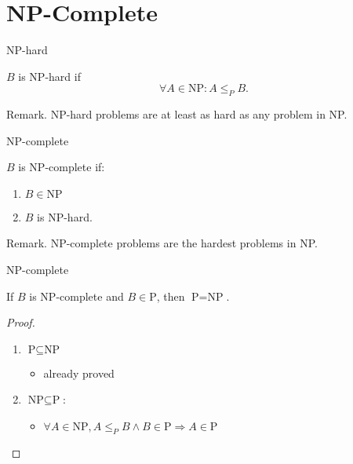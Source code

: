 \section{NP-Complete}

\begin{frame}{NP-hard}
  \begin{definition}[NP-hard]
    $B$ is NP-hard if
    \[
      \forall A \in \text{NP}: A \le_{P} B.
    \]
  \end{definition}

  \begin{alertblock}{Remark.}
    NP-hard problems are at least as hard as any problem in NP.
  \end{alertblock}
\end{frame}
\begin{frame}{NP-complete}
  \begin{definition}[NP-complete]
    $B$ is NP-complete if:
    \begin{enumerate}
      \item $B \in \text{NP}$
      \item $B$ is NP-hard.
    \end{enumerate}
  \end{definition}

  \begin{alertblock}{Remark.}
    NP-complete problems are the hardest problems in NP.
  \end{alertblock}
\end{frame}
\begin{frame}{NP-complete}
  \begin{theorem}
    If $B$ is NP-complete and $B \in \text{P}$, then $\text{P} = \text{NP}$.
  \end{theorem}

  \begin{proof}
    \begin{enumerate}
      \item $\text{P} \subseteq \text{NP}$
	\begin{itemize}
	  \item already proved
	\end{itemize}
      \item $\text{NP} \subseteq \text{P}$:
        \begin{itemize}
	  \item $\forall A \in \text{NP}, A \le_{P} B \land B \in \text{P} \Rightarrow A \in \text{P}$
	\end{itemize}
    \end{enumerate}
  \end{proof}
\end{frame}
